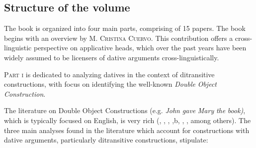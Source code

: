 \documentclass[output=paper,modfonts,nonflat]{langsci/langscibook}
\begin{document}
\begin{listWWviiiNumiileveli}
\item \begin{listWWviiiNumiilevelii}
\item \subsection{Structure of the volume}
\end{listWWviiiNumiilevelii}
\end{listWWviiiNumiileveli}
\begin{styleBodyA}
The book is organized into four main parts, comprising of 15 papers. The book begins with an overview by M. \textsc{Cristina} \textsc{Cuervo}. This contribution offers a cross-linguistic perspective on applicative heads, which over the past years have been widely assumed to be licensers of dative arguments cross-linguistically.
\end{styleBodyA}

\begin{styleBodyA}
\textsc{Part} \textsc{i} is dedicated to analyzing datives in the context of ditransitive constructions, with focus on identifying the well-known \textit{Double} \textit{Object} \textit{Construction}. 
\end{styleBodyA}

\begin{styleBodyA}
The literature on Double Object Constructions (e.g. \textit{John} \textit{gave} \textit{Mary} \textit{the} \textit{book)}, which is typically focused on English, is very rich (\citealt{Larson1988}, \citealt{Oehrle1976}, \citealt{Kayne1984}, \citealt{Jackendoff1990a},b, \citealt{Pesetsky1995}, \citealt{Harley2002}, among others). The three main analyses found in the literature which account for constructions with dative arguments, particularly ditransitive constructions, stipulate: 
\end{styleBodyA}
\end{document}

